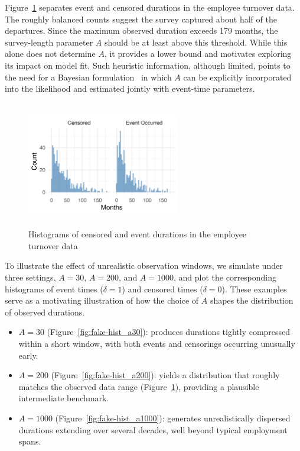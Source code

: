 \begin{example}
Figure~\ref{fig:离职数据分开的直方图} separates event and censored durations in the employee turnover data. The roughly balanced counts suggest the survey captured about half of the departures. Since the maximum observed duration exceeds 179 months, the survey-length parameter $A$ should be at least above this threshold. While this alone does not determine $A$, it provides a lower bound and motivates exploring its impact on model fit. Such heuristic information, although limited, points to the need for a Bayesian formulation~\cite{bartovs2022informed} in which $A$ can be explicitly incorporated into the likelihood and estimated jointly with event-time parameters. 
\begin{figure}[H]
    \centering
    \includegraphics[height=5.5cm, width=0.6\textwidth]{images/separate_hist.png}
    \caption{{\small Histograms of censored and event durations in the employee turnover data}}
    \label{fig:离职数据分开的直方图}
\end{figure}
To illustrate the effect of unrealistic observation windows, we simulate under three settings, $A = 30$, $A = 200$, and $A = 1000$, and plot the corresponding histograms of event times ($\delta = 1$) and censored times ($\delta = 0$). These examples serve as a motivating illustration of how the choice of $A$ shapes the distribution of observed durations.
\begin{itemize}
    \item $A = 30$ (Figure~\ref{fig:fake-hist_a30}): produces durations tightly compressed within a short window, 
    with both events and censorings occurring unusually early.
    \item $A = 200$ (Figure~\ref{fig:fake-hist_a200}): yields a distribution that roughly matches the observed data range 
    (Figure~\ref{fig:离职数据分开的直方图}), providing a plausible intermediate benchmark.
    \item $A = 1000$ (Figure~\ref{fig:fake-hist_a1000}): generates unrealistically dispersed durations extending over several decades, well beyond typical employment spans.
\end{itemize}


\end{example}
